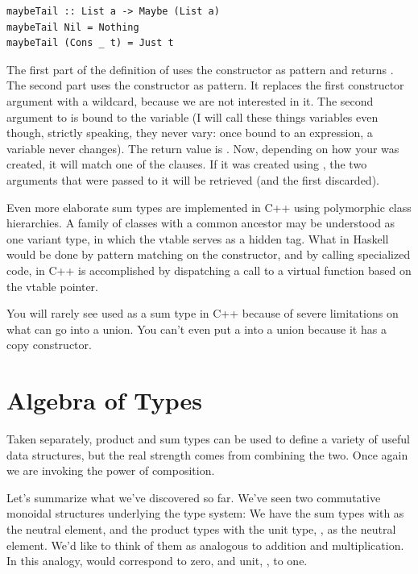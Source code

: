 \begin{Verbatim}
maybeTail :: List a -> Maybe (List a)
maybeTail Nil = Nothing
maybeTail (Cons _ t) = Just t
\end{Verbatim}
The first part of the definition of  uses the
 constructor as pattern and returns . The
second part uses the  constructor as pattern. It replaces
the first constructor argument with a wildcard, because we are not
interested in it. The second argument to  is bound to the
variable  (I will call these things variables even though,
strictly speaking, they never vary: once bound to an expression, a
variable never changes). The return value is . Now,
depending on how your  was created, it will match one of
the clauses. If it was created using , the two arguments
that were passed to it will be retrieved (and the first discarded).

Even more elaborate sum types are implemented in C++ using polymorphic
class hierarchies. A family of classes with a common ancestor may be
understood as one variant type, in which the vtable serves as a hidden
tag. What in Haskell would be done by pattern matching on the
constructor, and by calling specialized code, in C++ is accomplished by
dispatching a call to a virtual function based on the vtable pointer.

You will rarely see  used as a sum type in C++ because of
severe limitations on what can go into a union. You can't even put a
 into a union because it has a copy constructor.

\section{Algebra of Types}\label{algebra-of-types}

Taken separately, product and sum types can be used to define a variety
of useful data structures, but the real strength comes from combining
the two. Once again we are invoking the power of composition.

Let's summarize what we've discovered so far. We've seen two commutative
monoidal structures underlying the type system: We have the sum types
with  as the neutral element, and the product types with
the unit type, \code{()}, as the neutral element. We'd like to think
of them as analogous to addition and multiplication. In this analogy,
 would correspond to zero, and unit, \code{()}, to one.


